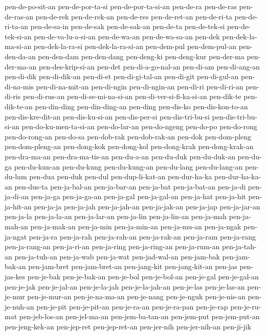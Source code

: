 {pen-de-po-sit-an pen-de-por-ta-si pen-de-por-ta-si-an pen-de-ra pen-de-ras
pen-de-ras-an pen-de-rek pen-de-rek-an pen-de-res pen-de-ret-an
pen-de-ri-ta pen-de-ri-ta-an pen-de-sa-in pen-de-sak pen-de-sak-an
pen-de-ta pen-de-tek-si pen-de-tek-si-an pen-de-va-lu-a-si-an pen-de-wa-an
pen-de-wa-sa-an pen-dek pen-dek-la-ma-si-an pen-dek-la-ra-si
pen-dek-la-ra-si-an pen-dem-pul pen-dem-pul-an pen-den-da-an pen-den-dam
pen-den-dang pen-deng-ki pen-deng-kur pen-der-ma pen-der-ma-an
pen-des-krip-si-an pen-det pen-di-a-go-nal-an pen-di-am pen-di-ang-an
pen-di-dik pen-di-dik-an pen-di-et pen-di-gi-tal-an pen-di-git
pen-di-gul-an pen-di-na-mis pen-di-na-mit-an pen-di-ngin pen-di-ngin-an
pen-di-ri pen-di-ri-an pen-di-ris pen-di-rus-an pen-di-se-mi-na-si-an
pen-di-ver-si-fi-ka-si-an pen-dik-te pen-dik-te-an pen-din-ding
pen-din-ding-an pen-ding pen-dis-ko pen-dis-kon-to-an pen-dis-kre-dit-an
pen-dis-ku-si-an pen-dis-per-si pen-dis-tri-bu-si pen-dis-tri-bu-si-an
pen-do-ku-men-ta-si-an pen-do-lar-an pen-do-ngeng pen-do-po pen-do-rong
pen-do-rong-an pen-do-sa pen-dob-rak pen-dob-rak-an pen-dok pen-dom-pleng
pen-dom-pleng-an pen-dong-kok pen-dong-kol pen-dong-krak pen-dong-krak-an
pen-dra-ma-an pen-dra-ma-tis-an pen-du-a-an pen-du-duk pen-du-duk-an
pen-du-ga pen-du-kun-an pen-du-kung pen-du-kung-an pen-du-lang
pen-du-lang-an pen-du-lum pen-dua pen-duk pen-dul pen-dup-li-kat-an
pen-dur-ha-ka pen-dur-ha-ka-an pen-dus-ta pen-ja-bal-an pen-ja-bar-an
pen-ja-bat pen-ja-bat-an pen-ja-di pen-ja-di-an pen-ja-ga pen-ja-ga-an
pen-ja-gal pen-ja-gal-an pen-ja-hat pen-ja-hit pen-ja-hit-an pen-ja-ja
pen-ja-jah pen-ja-jah-an pen-ja-jak-an pen-ja-jap pen-ja-jar-an pen-ja-la
pen-ja-la-an pen-ja-lar-an pen-ja-lin pen-ja-lin-an pen-ja-mah
pen-ja-mah-an pen-ja-mak-an pen-ja-min pen-ja-min-an pen-ja-mu-an
pen-ja-ngak pen-ja-ngat pen-ja-ra pen-ja-rah pen-ja-rah-an pen-ja-rak-an
pen-ja-ram pen-ja-rang pen-ja-rang-an pen-ja-ri-an pen-ja-ring
pen-ja-ring-an pen-ja-rum-an pen-ja-tah-an pen-ja-tuh-an pen-ja-wab
pen-ja-wat pen-jad-wal-an pen-jam-bak pen-jam-bak-an pen-jam-bret
pen-jam-bret-an pen-jang-kit pen-jang-kit-an pen-jas pen-jas-kes
pen-je-bak pen-je-bak-an pen-je-bol pen-je-bol-an pen-je-gal pen-je-gal-an
pen-je-jak pen-je-jal-an pen-je-la-jah pen-je-la-jah-an pen-je-las
pen-je-las-an pen-je-mur pen-je-mur-an pen-je-na-ma-an pen-je-nang
pen-je-nguk pen-je-nis-an pen-je-nuh-an pen-je-pit pen-je-pit-an
pen-je-ra-an pen-je-ra-pan pen-je-rap pen-je-ru-mat pen-jeb-los-an
pen-jel-ma-an pen-jem-ba-tan-an pen-jem-put pen-jem-put-an pen-jeng-kek-an
pen-jep-ret pen-jep-ret-an pen-jer-nih pen-jer-nih-an pen-ji-jik
}
